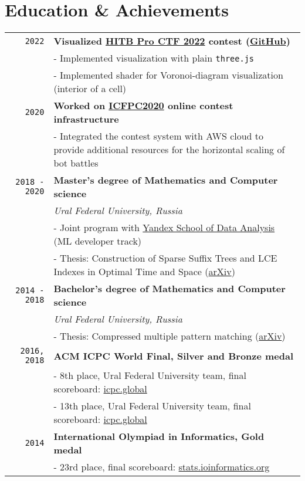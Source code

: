 \documentclass[10pt,a4paper]{article}
\begin{document}
\section{Education \& Achievements}
\vspace{1mm}
\begin{tabular}{r p{14cm}}
	\texttt{2022} & \textbf{Visualized \href{https://proctf.cyberweek.ae/}{HITB Pro CTF 2022} contest (\href{https://github.com/sivukhin/cell-visualization}{GitHub})}\\
	& \small{- Implemented visualization with plain \texttt{three.js}}\\
	& \small{- Implemented shader for Voronoi-diagram visualization (interior of a cell)}\\

	\texttt{2020} & \textbf{Worked on \href{https://icfpcontest2020.github.io}{ICFPC2020} online contest infrastructure}\\
	& \small{- Integrated the contest system with AWS cloud to provide additional resources for the horizontal scaling of bot battles}\\

    \texttt{2018 - 2020} & \textbf{Master's degree of Mathematics and Computer science} \\
    & \small\textit{Ural Federal University, Russia}\\
    & \small{- Joint program with \href{https://dataschool.yandex.com/}{Yandex School of Data Analysis}} (ML developer track) \\
    & \small{- Thesis: Construction of Sparse Suffix Trees and LCE Indexes in Optimal Time and Space (\href{https://arxiv.org/abs/2105.03782}{arXiv})} \\

    \texttt{2014 - 2018} & \textbf{Bachelor's degree of Mathematics and Computer science} \\
    & \small\textit{Ural Federal University, Russia}\\
    & \small{- Thesis: Compressed multiple pattern matching (\href{https://arxiv.org/abs/1811.01248}{arXiv})} \\

    \texttt{2016, 2018} & \textbf{ACM ICPC World Final, Silver and Bronze medal}\\
    & \small{- 8th place, Ural Federal University team, final scoreboard: \href{https://icpc.global/community/results-2016}{icpc.global}}\\
    & \small{- 13th place, Ural Federal University team, final scoreboard: \href{https://icpc.global/community/results-2018}{icpc.global}}\\

	\texttt{2014} & \textbf{International Olympiad in Informatics, Gold medal}\\
	& \small{- 23rd place, final scoreboard: \href{http://stats.ioinformatics.org/results/2014}{stats.ioinformatics.org}}
\end{tabular}
\end{document}

